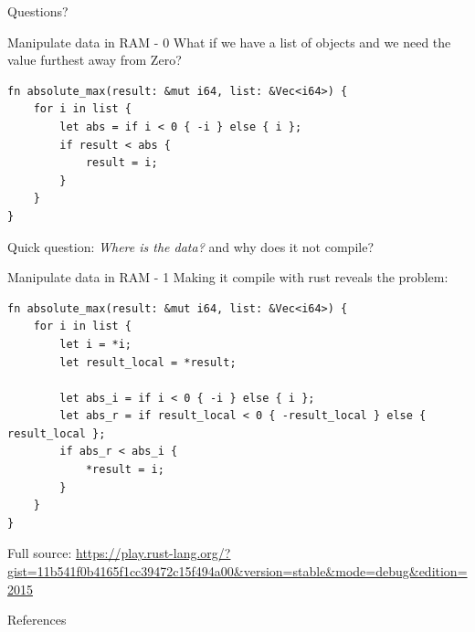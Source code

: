 \documentclass[10pt]{beamer}
\newcommand{\themename}{\textbf{\textsc{metropolis}}\xspace}
\begin{document}
{
\begin{frame}[standout]
  Questions?
\end{frame}
}

\appendix

%
%


\begin{frame}[fragile]{Manipulate data in RAM - 0}
What if we have a list of objects and we need the value furthest away from Zero?
\begin{verbatim}
fn absolute_max(result: &mut i64, list: &Vec<i64>) {
    for i in list {
        let abs = if i < 0 { -i } else { i };
        if result < abs {
            result = i;
        }
    }
}
\end{verbatim}
Quick question: \emph{Where is the data?} and why does it \alert{not} compile?
\end{frame}

\begin{frame}[fragile]{Manipulate data in RAM - 1}
Making it compile with rust reveals the problem:
\begin{verbatim}
fn absolute_max(result: &mut i64, list: &Vec<i64>) {
    for i in list {
        let i = *i;
        let result_local = *result;

        let abs_i = if i < 0 { -i } else { i };
        let abs_r = if result_local < 0 { -result_local } else { result_local };
        if abs_r < abs_i {
            *result = i;
        }
    }
}
\end{verbatim}
Full source: \url{https://play.rust-lang.org/?gist=11b541f0b4165f1cc39472c15f494a00&version=stable&mode=debug&edition=2015}
\end{frame}

\begin{frame}[allowframebreaks]{References}

  
  

\end{frame}
\end{document}
